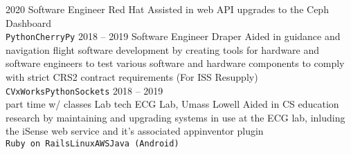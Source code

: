 \documentclass[9pt]{developercv} %
\begin{document}
\vspace{0.5cm}




\begin{entrylist}
	\entry
		{2020}
		{Software Engineer}
		{Red Hat}
		{Assisted in web API upgrades to the Ceph Dashboard\\
        \texttt{Python}\slashsep\texttt{CherryPy}}
	\entry
		{2018 -- 2019}
		{Software Engineer}
		{Draper}
		{Aided in guidance and navigation flight software development by creating
        tools for hardware and software engineers to test various software and
        hardware components to comply with strict CRS2 contract requirements (For ISS Resupply)\\
        \texttt{C}\slashsep\texttt{VxWorks}\slashsep\texttt{Python}\slashsep\texttt{Sockets}}
	\entry
		{2018 -- 2019\\\footnotesize{part time w/ classes}}
		{Lab tech}
        {ECG Lab, Umass Lowell}
		{Aided in CS education research by maintaining and upgrading systems in use at the ECG lab,
        inluding the iSense web service and it's associated appinventor plugin\\
        \texttt{Ruby on Rails}\slashsep\texttt{Linux}\slashsep\texttt{AWS}\slashsep\texttt{Java (Android)}}
\end{entrylist}
\end{document}
